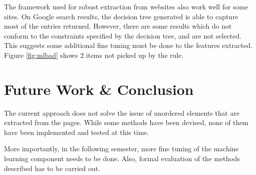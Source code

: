 \documentclass[a4paper,12pt]{article}
\begin{document}
The framework used for robust extraction from websites also work well for some sites. On Google search results, the decision tree generated is able to capture most of the entries returned. However, there are some results which do not conform to the constraints specified by the decision tree, and are not selected. This suggests some additional fine tuning must be done to the features extracted. Figure \ref{fig:mlbad} shows 2 items not picked up by the rule.

\section{Future Work \& Conclusion}
The current approach does not solve the issue of unordered elements that are extracted from the pages. While some methods have been devised, none of them have been implemented and tested at this time.

More importantly, in the following semester, more fine tuning of the machine learning component needs to be done. Also, formal evaluation of the methods described has to be carried out.


{}
\end{document}
